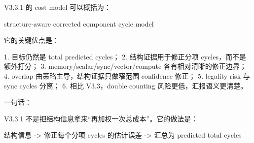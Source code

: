 \documentclass[
  10pt,
]{article}
\newenvironment{Shaded}{}{}
\newcommand{\NormalTok}[1]{#1}
\begin{document}
V3.3.1 的 cost model 可以概括为：

\begin{Shaded}
\begin{Highlighting}[]
\NormalTok{structure{-}aware corrected component cycle model}
\end{Highlighting}
\end{Shaded}

它的关键优点是：

\begin{Shaded}
\begin{Highlighting}[]
\NormalTok{1. 目标仍然是 total predicted cycles；}
\NormalTok{2. 结构证据用于修正分项 cycles，而不是额外打分；}
\NormalTok{3. memory/scalar/sync/vector/compute 各有相对清晰的修正边界；}
\NormalTok{4. overlap 由策略主导，结构证据只做窄范围 confidence 修正；}
\NormalTok{5. legality risk 与 sync cycles 分离；}
\NormalTok{6. 相比 V3.3，double counting 风险更低，汇报语义更清楚。}
\end{Highlighting}
\end{Shaded}

一句话：

V3.3.1 不是把结构信息拿来``再加权一次总成本''。它的做法是：

\begin{Shaded}
\begin{Highlighting}[]
\NormalTok{结构信息 {-}\textgreater{} 修正每个分项 cycles 的估计误差 {-}\textgreater{} 汇总为 predicted total cycles}
\end{Highlighting}
\end{Shaded}
\end{document}
